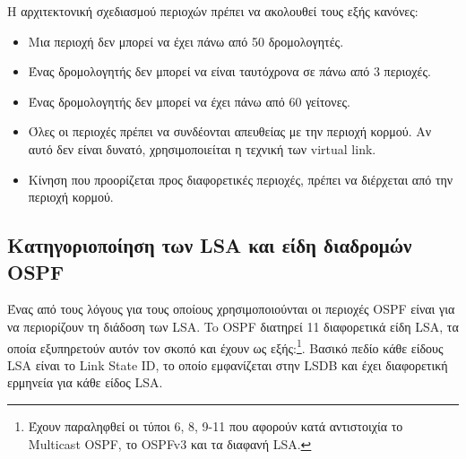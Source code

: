 \documentclass{EdipyLabs} %
\begin{document}
Η αρχιτεκτονική σχεδιασμού περιοχών πρέπει να ακολουθεί τους εξής κανόνες:
\begin{itemize}
	\item Μια περιοχή δεν μπορεί να έχει πάνω από 50 δρομολογητές.
	\item Ένας δρομολογητής δεν μπορεί να είναι ταυτόχρονα σε πάνω από 3 περιοχές.
	\item Ένας δρομολογητής δεν μπορεί να έχει πάνω από 60 γείτονες.
	\item Όλες οι περιοχές πρέπει να συνδέονται απευθείας με την περιοχή κορμού. Αν αυτό δεν είναι δυνατό, χρησιμοποιείται η τεχνική των virtual link. 
	\item Κίνηση που προορίζεται προς διαφορετικές περιοχές, πρέπει να διέρχεται από την περιοχή κορμού.
\end{itemize}


\subsection{Κατηγοριοποίηση των LSA και είδη διαδρομών OSPF}

Ένας από τους λόγους για τους οποίους χρησιμοποιούνται οι περιοχές OSPF είναι για να περιορίζουν τη διάδοση των LSA. To OSPF διατηρεί 11 διαφορετικά είδη LSA, τα οποία εξυπηρετούν αυτόν τον σκοπό και έχουν ως εξής:\footnote{Έχουν παραληφθεί οι τύποι 6, 8, 9-11 που αφορούν κατά αντιστοιχία το Multicast OSPF, το OSPFv3 και τα διαφανή LSA.}. Βασικό πεδίο κάθε είδους LSA είναι το Link State ID, το οποίο εμφανίζεται στην LSDB και έχει διαφορετική ερμηνεία για κάθε είδος LSA.
\end{document}
